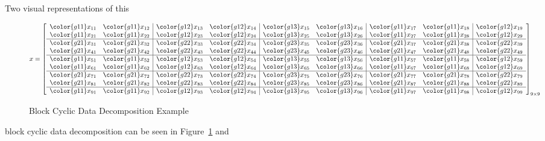 Two visual representations of this 
\begin{figure}[h]
\begin{align*}
x &= \left[
      \begin{array}{ll|ll|ll|ll|l}
      \color{g11}x_{11} & \color{g11}x_{12} & \color{g12}x_{13} & \color{g12}x_{14} & \color{g13}x_{15} & \color{g13}x_{16} & \color{g11}x_{17} & \color{g11}x_{18} & \color{g12}x_{19}\\
      \color{g11}x_{21} & \color{g11}x_{22} & \color{g12}x_{23} & \color{g12}x_{24} & \color{g13}x_{25} & \color{g13}x_{26} & \color{g11}x_{27} & \color{g11}x_{28} & \color{g12}x_{29}\\\hline
      \color{g21}x_{31} & \color{g21}x_{32} & \color{g22}x_{33} & \color{g22}x_{34} & \color{g23}x_{35} & \color{g23}x_{36} & \color{g21}x_{37} & \color{g21}x_{38} & \color{g22}x_{39}\\
      \color{g21}x_{41} & \color{g21}x_{42} & \color{g22}x_{43} & \color{g22}x_{44} & \color{g23}x_{45} & \color{g23}x_{46} & \color{g21}x_{47} & \color{g21}x_{48} & \color{g22}x_{49}\\\hline
      \color{g11}x_{51} & \color{g11}x_{52} & \color{g12}x_{53} & \color{g12}x_{54} & \color{g13}x_{55} & \color{g13}x_{56} & \color{g11}x_{57} & \color{g11}x_{58} & \color{g12}x_{59}\\
      \color{g11}x_{61} & \color{g11}x_{62} & \color{g12}x_{63} & \color{g12}x_{64} & \color{g13}x_{65} & \color{g13}x_{66} & \color{g11}x_{67} & \color{g11}x_{68} & \color{g12}x_{69}\\\hline
      \color{g21}x_{71} & \color{g21}x_{72} & \color{g22}x_{73} & \color{g22}x_{74} & \color{g23}x_{75} & \color{g23}x_{76} & \color{g21}x_{77} & \color{g21}x_{78} & \color{g22}x_{79}\\
      \color{g21}x_{81} & \color{g21}x_{82} & \color{g22}x_{83} & \color{g22}x_{84} & \color{g23}x_{85} & \color{g23}x_{86} & \color{g21}x_{87} & \color{g21}x_{88} & \color{g22}x_{89}\\\hline
      \color{g11}x_{91} & \color{g11}x_{92} & \color{g12}x_{93} & \color{g12}x_{94} & \color{g13}x_{95} & \color{g13}x_{96} & \color{g11}x_{97} & \color{g11}x_{98} & \color{g12}x_{99}\\
      \end{array}
\right]_{9\times 9}
\end{align*}
\caption{Block Cyclic Data Decomposition Example}\label{fig:blockcyclic}
\end{figure}
block cyclic data decomposition can be seen in Figure~\ref{fig:blockcyclic} and 
